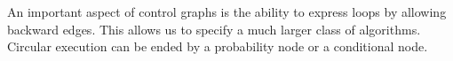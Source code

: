 \documentclass[letterpaper]{article}
\newcommand\rNote[1]{\todo[inline, author=Ronen, color=yellow]{#1}}
\newcommand\aNote[1]{\todo[inline, author=Alex, color=GreenYellow]{#1}}
\newcommand{\frameImage}[4]{
\begin{figure}[H]
  \centerline{
    \fcolorbox{frameColor}{white}{
        \texttt{[image: \#1]} } }
    \caption{#4}
    \label{fig:#1}
\end{figure}
}
\begin{document}
An important aspect of control graphs is the ability to express loops by allowing backward edges. This allows us to specify a much larger class of algorithms. Circular execution can be ended by a probability node or a conditional node.








\end{document}
